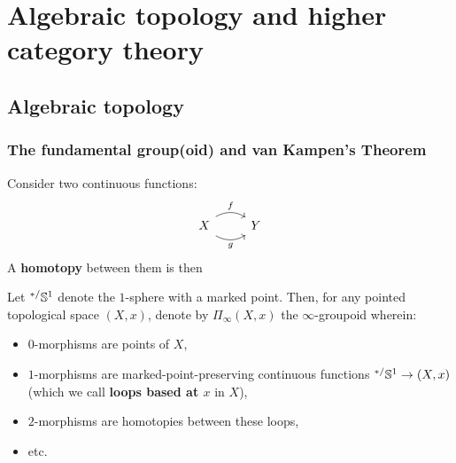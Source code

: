 \chapter{Algebraic topology and higher category theory}
    \begin{abstract}
        
    \end{abstract}
    
    \minitoc
    
    \section{Algebraic topology}
        \subsection{The fundamental group(oid) and van Kampen's Theorem}
            \begin{definition}[Homotopies] \label{def: homotopies}
                Consider two continuous functions:
                    $$
                        \begin{tikzcd}
                            X \arrow[r, "g"', bend right, shift right] \arrow[r, "f", bend left, shift left] & Y
                        \end{tikzcd}
                    $$
                A \textbf{homotopy} between them is then  
            \end{definition}
        
            \begin{definition} \label{def: the_fundamental_groupoid}
                Let ${}^{*/}\mathbb{S}^1$ denote the $1$-sphere with a marked point. Then, for any pointed topological space $(X, x)$, denote by $\Pi_{\infty}(X, x)$ the $\infty$-groupoid wherein:
                    \begin{itemize}
                        \item $0$-morphisms are points of $X$,
                        \item $1$-morphisms are marked-point-preserving continuous functions ${}^{*/}\mathbb{S}^1 \to (X, x)$ (which we call \textbf{loops based at $x$} in $X$),
                        \item $2$-morphisms are homotopies between these loops,
                        \item etc.
                    \end{itemize}
            \end{definition}
        
